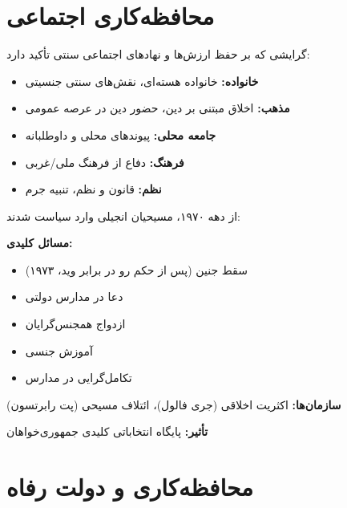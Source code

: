 \section{محافظه‌کاری اجتماعی}

\begin{defbox}
گرایشی که بر حفظ ارزش‌ها و نهادهای اجتماعی سنتی تأکید دارد:
\begin{itemize}[nosep]
    \item \textbf{خانواده:} خانواده هسته‌ای، نقش‌های سنتی جنسیتی
    \item \textbf{مذهب:} اخلاق مبتنی بر دین، حضور دین در عرصه عمومی
    \item \textbf{جامعه محلی:} پیوندهای محلی و داوطلبانه
    \item \textbf{فرهنگ:} دفاع از فرهنگ ملی/غربی
    \item \textbf{نظم:} قانون و نظم، تنبیه جرم
\end{itemize}
\end{defbox}

\begin{historybox}
از دهه ۱۹۷۰، مسیحیان انجیلی وارد سیاست شدند:

\textbf{مسائل کلیدی:}
\begin{itemize}[nosep]
    \item سقط جنین (پس از حکم رو در برابر وید، ۱۹۷۳)
    \item دعا در مدارس دولتی
    \item ازدواج همجنس‌گرایان
    \item آموزش جنسی
    \item تکامل‌گرایی در مدارس
\end{itemize}

\textbf{سازمان‌ها:} اکثریت اخلاقی (جری فالول)، ائتلاف مسیحی (پت رابرتسون)

\textbf{تأثیر:} پایگاه انتخاباتی کلیدی جمهوری‌خواهان
\end{historybox}

\section{محافظه‌کاری و دولت رفاه}

